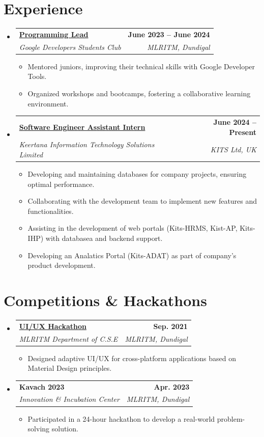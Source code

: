 \documentclass[a4paper,11pt]{article}
\makeatletter
\newcommand{\resumeItem}[1]{\item\small{{#1 \vspace{-2pt}}}}
\newcommand{\resumeSubheading}[4]{
  \vspace{-2pt}\item
    \begin{tabular*}{0.97\textwidth}[t]{l@{\extracolsep{\fill}}r}
      \textbf{#1} & \textbf{\small #2} \\
      \textit{\small#3} & \textit{\small #4} \\
    \end{tabular*}\vspace{-7pt}
}
\newcommand{\resumeSubHeadingListStart}{\begin{itemize}[leftmargin=0.15in, label={}]}
\newcommand{\resumeSubHeadingListEnd}{\end{itemize}}
\newcommand{\resumeItemListStart}{\begin{itemize}}
\newcommand{\resumeItemListEnd}{\end{itemize}\vspace{-5pt}}
\makeatother
\begin{document}
\section{Experience}
    \resumeSubHeadingListStart
        \resumeSubheading
            {\href{https://g.dev/tsrinu2003}{Programming Lead}}{June 2023 -- June 2024}
            {Google Developers Students Club}{MLRITM, Dundigal}
            \resumeItemListStart
                \resumeItem{Mentored juniors, improving their technical skills with Google Developer Tools.}
                \resumeItem{Organized workshops and bootcamps, fostering a collaborative learning environment.}
        \resumeItemListEnd
        \resumeSubheading
            {\href{http://kitsltd.co.uk/index.html}{Software Engineer Assistant Intern}}{June 2024 -- Present}
            {Keertana Information Technology Solutions Limited}{KITS Ltd, UK}
            \resumeItemListStart
                \resumeItem{Developing and maintaining databases for company projects, ensuring optimal performance.}
                \resumeItem{Collaborating with the development team to implement new features and functionalities.}
                \resumeItem{Assisting in the development of web portals (Kits-HRMS, Kist-AP, Kits-IHP) with databasea and backend support.}
                \resumeItem{Developing an Analatics Portal (Kits-ADAT) as part of company's product development.}
        \resumeItemListEnd
    \resumeSubHeadingListEnd

\section{Competitions \& Hackathons}
    \resumeSubHeadingListStart
        \resumeSubheading
            {\href{https://drive.google.com/file/d/1M_5k71Pplh6leoRYhYY6SjMcuziMO_Cd/view?usp=sharing}{UI/UX Hackathon}}{Sep. 2021}
            {MLRITM Department of C.S.E}{MLRITM, Dundigal}
            \resumeItemListStart
                \resumeItem{Designed adaptive UI/UX for cross-platform applications based on Material Design principles.}
        \resumeItemListEnd

        \resumeSubheading
            {Kavach 2023}{Apr. 2023}
            {Innovation \& Incubation Center}{MLRITM, Dundigal}
            \resumeItemListStart
                \resumeItem{Participated in a 24-hour hackathon to develop a real-world problem-solving solution.}
        \resumeItemListEnd
    \resumeSubHeadingListEnd
\end{document}
